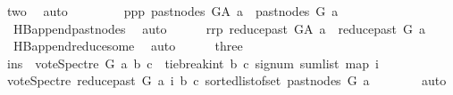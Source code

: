 \begin{isabellebody}
\ two\ \isamarkupfalse%
\ auto\isanewline
\ \ \isamarkupfalse%
\isanewline
\ \ \ \ \isamarkupfalse%
\ ppp{\isacharcolon}{\kern0pt}\ {\isachardoublequoteopen}past{\isacharunderscore}{\kern0pt}nodes\ G{\isacharunderscore}{\kern0pt}A\ a\ {\isacharequal}{\kern0pt}\ past{\isacharunderscore}{\kern0pt}nodes\ G\ a{\isachardoublequoteclose}\ \isamarkupfalse%
\ {}{\isacharparenleft}{\kern0pt}{}{\isacharparenright}{\kern0pt}\ HB{}{\isachardot}{\kern0pt}append{\isacharunderscore}{\kern0pt}past{\isacharunderscore}{\kern0pt}nodes\ \isamarkupfalse%
\ auto\isanewline
\ \ \ \ \isamarkupfalse%
\ rrp{\isacharcolon}{\kern0pt}\ {\isachardoublequoteopen}reduce{\isacharunderscore}{\kern0pt}past\ G{\isacharunderscore}{\kern0pt}A\ a\ {\isacharequal}{\kern0pt}\ reduce{\isacharunderscore}{\kern0pt}past\ G\ a{\isachardoublequoteclose}\ \isamarkupfalse%
\ {}{\isacharparenleft}{\kern0pt}{}{\isacharparenright}{\kern0pt}\ HB{}{\isachardot}{\kern0pt}append{\isacharunderscore}{\kern0pt}reduce{\isacharunderscore}{\kern0pt}some\ \isamarkupfalse%
\ auto\isanewline
\ \ \ \ \isamarkupfalse%
\ three\isanewline
\ \ \ \ \isamarkupfalse%
\ \isamarkupfalse%
\ ins{\isacharcolon}{\kern0pt}\ {\isachardoublequoteopen}\ vote{\isacharunderscore}{\kern0pt}Spectre\ G\ a\ b\ c\ {\isacharequal}{\kern0pt}\ {\isacharparenleft}{\kern0pt}tie{\isacharunderscore}{\kern0pt}break{\isacharunderscore}{\kern0pt}int\ b\ c\ {\isacharparenleft}{\kern0pt}signum\ {\isacharparenleft}{\kern0pt}sum{\isacharunderscore}{\kern0pt}list\ {\isacharparenleft}{\kern0pt}map\ {\isacharparenleft}{\kern0pt}{\isasymlambda}i{\isachardot}{\kern0pt}\isanewline
\ {\isacharparenleft}{\kern0pt}vote{\isacharunderscore}{\kern0pt}Spectre\ {\isacharparenleft}{\kern0pt}reduce{\isacharunderscore}{\kern0pt}past\ G\ a{\isacharparenright}{\kern0pt}\ i\ b\ c{\isacharparenright}{\kern0pt}{\isacharparenright}{\kern0pt}\ {\isacharparenleft}{\kern0pt}sorted{\isacharunderscore}{\kern0pt}list{\isacharunderscore}{\kern0pt}of{\isacharunderscore}{\kern0pt}set\ {\isacharparenleft}{\kern0pt}past{\isacharunderscore}{\kern0pt}nodes\ G\ a{\isacharparenright}{\kern0pt}{\isacharparenright}{\kern0pt}{\isacharparenright}{\kern0pt}{\isacharparenright}{\kern0pt}{\isacharparenright}{\kern0pt}{\isacharparenright}{\kern0pt}{\isachardoublequoteclose}\isanewline
\ \ \ \ \ \ \isamarkupfalse%
\ auto\isanewline
\ \ \ \ \isamarkupfalse%

\end{isabellebody}
